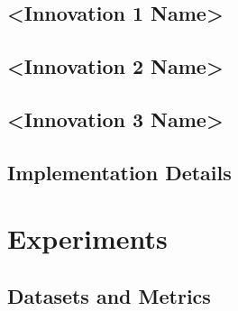 \documentclass[journal,onecolumn,draftcls]{IEEEtran}
\begin{document}
\subsection{<Innovation 1 Name>}
\label{sec:method-innov1}


\subsection{<Innovation 2 Name>}
\label{sec:method-innov2}


\subsection{<Innovation 3 Name>}
\label{sec:method-innov3}



\subsection{Implementation Details}
\label{sec:method-implementation}


\section{Experiments}
\label{sec:experiments}

\subsection{Datasets and Metrics}
\label{sec:exp-data}

\end{document}
